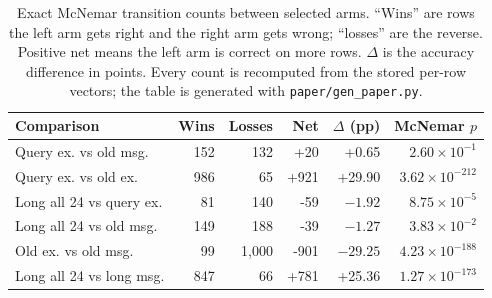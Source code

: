 \begin{table}[t]
\centering
\footnotesize
\caption{Exact McNemar transition counts between selected arms. ``Wins'' are
rows the left arm gets right and the right arm gets wrong; ``losses'' are the
reverse. Positive net means the left arm is correct on more rows. $\Delta$ is
the accuracy difference in points. Every count is recomputed from the stored
per-row vectors; the table is generated with
\texttt{paper/gen\_paper.py}.}
\label{tab:transitions}
\setlength{\tabcolsep}{3pt}
\begin{tabular}{@{}lrrrrr@{}}
\toprule
Comparison & Wins & Losses & Net & $\Delta$ (pp) & McNemar $p$ \\
\midrule
Query ex. vs old msg. & 152 & 132 & +20 & +0.65 & $2.60\times10^{-1}$ \\
Query ex. vs old ex. & 986 & 65 & +921 & +29.90 & $3.62\times10^{-212}$ \\
Long all 24 vs query ex. & 81 & 140 & -59 & $-1.92$ & $8.75\times10^{-5}$ \\
Long all 24 vs old msg. & 149 & 188 & -39 & $-1.27$ & $3.83\times10^{-2}$ \\
Old ex. vs old msg. & 99 & 1{,}000 & -901 & $-29.25$ & $4.23\times10^{-188}$ \\
Long all 24 vs long msg. & 847 & 66 & +781 & +25.36 & $1.27\times10^{-173}$ \\
\bottomrule
\end{tabular}
\end{table}
